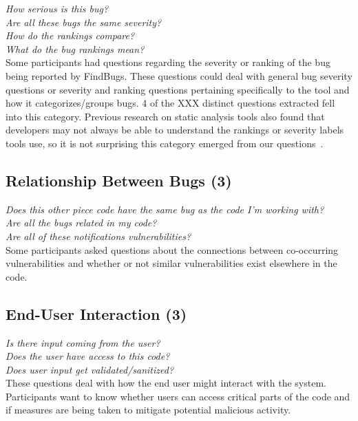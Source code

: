 \documentclass[conference]{IEEEtran}
\begin{document}
\noindent\emph{How serious is this bug?} \\
\emph{Are all these bugs the same severity?} \\
\emph{How do the rankings compare?} \\
\emph{What do the bug rankings mean?} \\

Some participants had questions regarding the severity or ranking of the bug being reported by FindBugs. These questions could deal with general bug severity questions or severity and ranking questions pertaining specifically to the tool and how it categorizes/groups bugs. 4 of the XXX distinct questions extracted fell into this category. Previous research on static analysis tools also found that developers may not always be able to understand the rankings or severity labels tools use, so it is not surprising this category emerged from our questions~\cite{johnson2013don}.



\noindent\subsection{\textbf{Relationship Between Bugs (3)}}

\noindent\emph{Does this other piece code have the same bug as the code I'm working with?} \\
\emph{Are all the bugs related in my code?} \\
\emph{Are all of these notifications vulnerabilities?} \\

Some participants asked questions about the connections between co-occurring vulnerabilities and whether or not similar vulnerabilities exist elsewhere in the code. 


\noindent\subsection{\textbf{End-User Interaction (3)}}

\noindent\emph{Is there input coming from the user?} \\
\emph{Does the user have access to this code?} \\
\emph{Does user input get validated/sanitized?} \\

These questions deal with how the end user might interact with the system. Participants want to know whether users can access critical parts of the code and if measures are being taken to mitigate potential malicious activity. 
\end{document}
